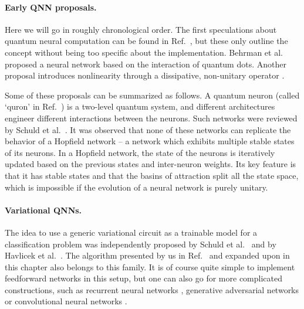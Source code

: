 \paragraph{Early QNN proposals.}
Here we will go in roughly chronological order. The first speculations about quantum neural computation can be found in Ref.~\cite{kak_quantum_1995}, but these only outline the concept without being too specific about the implementation. Behrman et al.~\cite{behrman_simulations_2000} proposed a neural network based on the interaction of quantum dots. Another proposal introduces nonlinearity through a dissipative, non-unitary operator \cite{gupta_quantum_2001}.

Some of these proposals can be summarized as follows. A quantum neuron (called `quron' in Ref.~\cite{schuld_quest_2014}) is a two-level quantum system, and different architectures engineer different interactions between the neurons. Such networks were reviewed by Schuld et al.~\cite{schuld_quest_2014}. It was observed that none of these networks can replicate the behavior of a Hopfield network -- a network which exhibits multiple stable states of its neurons. In a Hopfield network, the state of the neurons is iteratively updated based on the previous states and inter-neuron weights. Its key feature is that it has stable states and that the basins of attraction split all the state space, which is impossible if the evolution of a neural network is purely unitary.

\paragraph{Variational QNNs.}

The idea to use a generic variational circuit as a trainable model for a classification problem was independently proposed by Schuld et al.~\cite{schuld_circuit-centric_2020} and by Havlicek et al.~\cite{havlicek_supervised_2019}. The algorithm presented by us in Ref.~\cite{uvarov_machine_2020} and expanded upon in this chapter also belongs to this family. It is of course quite simple to implement feedforward networks in this setup, but one can also go for more complicated constructions, such as recurrent neural networks \cite{bausch_recurrent_2020}, generative adversarial networks \cite{dallaire-demers_quantum_2018} or convolutional neural networks \cite{pesah_absence_2020}.

